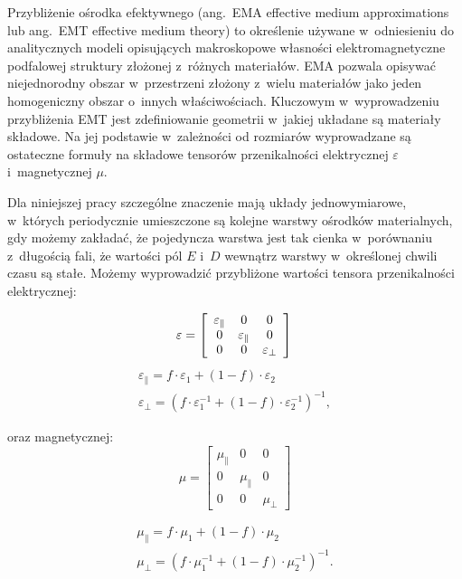 \label{subart:effmedium}
Przybliżenie ośrodka efektywnego (ang.~EMA effective medium approximations lub ang.~EMT effective medium theory) to określenie używane w~odniesieniu do analitycznych modeli opisujących makroskopowe własności elektromagnetyczne podfalowej struktury złożonej z~różnych materiałów. EMA pozwala opisywać niejednorodny obszar w~przestrzeni złożony z~wielu materiałów jako jeden homogeniczny obszar o~innych właściwościach. Kluczowym w~wyprowadzeniu przybliżenia EMT jest zdefiniowanie geometrii w~jakiej układane są materiały składowe. Na jej podstawie w~zależności od rozmiarów wyprowadzane są ostateczne formuły na składowe tensorów przenikalności elektrycznej $\varepsilon$ i~magnetycznej $\mu$.

Dla niniejszej pracy szczególne znaczenie mają układy jednowymiarowe, w~których periodycznie umieszczone są kolejne warstwy ośrodków materialnych, gdy możemy zakładać, że pojedyncza warstwa jest tak cienka w~porównaniu z~długością fali, że wartości pól $E$ i~$D$ wewnątrz warstwy w~określonej chwili czasu są stałe. Możemy wyprowadzić przybliżone wartości tensora przenikalności elektrycznej:

\[ \varepsilon= \left[ \begin{array}{ccc}
	\varepsilon_{\parallel} & 0 & 0 \\
	0 & \varepsilon_{\parallel} & 0 \\
	0 & 0 &  \varepsilon_{\perp} \end{array} \right] 
\\
\]
\begin{equation}
	\begin{gathered}
		\varepsilon_{\parallel}=f\cdot{\varepsilon_1}+(1-f)\cdot \varepsilon_2 \\ 
		\varepsilon_{\perp}=\left(f\cdot{\varepsilon_1^{-1}}+(1-f)\cdot \varepsilon_2^{-1}\right)^{-1},
	\end{gathered}
\label{eq:effmedium}
\end{equation}


oraz magnetycznej:
\[ \mu= \left[ \begin{array}{ccc}
					\mu_{\parallel} & 0 & 0 \\
					0 & \mu_{\parallel} & 0 \\
					0 & 0 &  \mu_{\perp} \end{array} \right]
\]

\begin{equation}
	\begin{gathered}
		\mu_{\parallel}=f\cdot{\mu_1}+(1-f)\cdot \mu_2 \\
		\mu_{\perp}=\left(f\cdot{\mu_1^{-1}}+(1-f)\cdot \mu_2^{-1}\right)^{-1}.
	\end{gathered}
\label{eq:effmedium-mu}
\end{equation}

